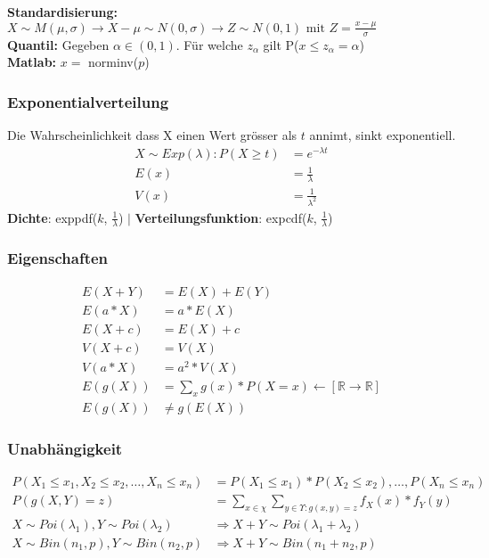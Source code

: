 \documentclass[landscape,twocolumn,a4paper]{article}
\newcommand{\RN}{\mathbb{R}} %
\begin{document}
\textbf{Standardisierung:} $X \sim M(\mu, \sigma) \rightarrow X-\mu \sim N(0,\sigma) \rightarrow Z \sim N(0,1) \text{ mit } Z=\frac{x-\mu}{\sigma}$ \\
\textbf{Quantil:} Gegeben $\alpha \in (0,1)$. Für welche $z_\alpha$ gilt P($x\leq z_\alpha=\alpha$) \\
\textbf{Matlab:} $x=$ norminv($p$)


\subsubsection*{Exponentialverteilung}
Die Wahrscheinlichkeit dass X einen Wert grösser als $t$ annimt, sinkt exponentiell.
\begin{align*}
	X \sim Exp(\lambda) : P(X \geq t) &= e^{-\lambda t} \\
	E(x) &= \frac{1}{\lambda}\\
	V(x) &= \frac{1}{\lambda^2}
\end{align*} 
\textbf{Dichte}: exppdf($k$, $\frac{1}{\lambda}$) $\mid$ \textbf{Verteilungsfunktion}: expcdf($k$, $\frac{1}{\lambda}$)

\subsubsection*{Eigenschaften}
\begin{align*}
	E(X + Y) &= E(X) + E(Y) \\
	E(a * X) &= a * E(X) \\
	E(X + c) &= E(X) + c\\
	V(X + c) &= V(X) \\
	V(a * X) &= a^2* V(X) \\
	E(g(X)) &= \sum_{x} g(x) * P(X=x) \leftarrow [\RN \rightarrow \RN] \\
	E(g(X)) &\neq g(E(X))
\end{align*} 

\subsubsection*{Unabhängigkeit}
\begin{align*}
P(X_1 \leq x_1, X_2 \leq x_2, \dots, X_n \leq x_n) &= P(X_1 \leq x_1) * P(X_2 \leq x_2), \dots, P(X_n \leq x_n) \\
P(g(X,Y) = z) &= \sum_{x \in \chi} \sum_{y\in \Upsilon:g(x,y)=z} f_X(x) * f_Y(y) \\
X \sim Poi(\lambda_1), Y \sim Poi(\lambda_2) &\Rightarrow X + Y \sim Poi(\lambda_1 + \lambda_2) \\
X \sim Bin(n_1,p), Y \sim Bin(n_2,p) &\Rightarrow X + Y \sim Bin(n_1 + n_2, p)
\end{align*}
\end{document}
